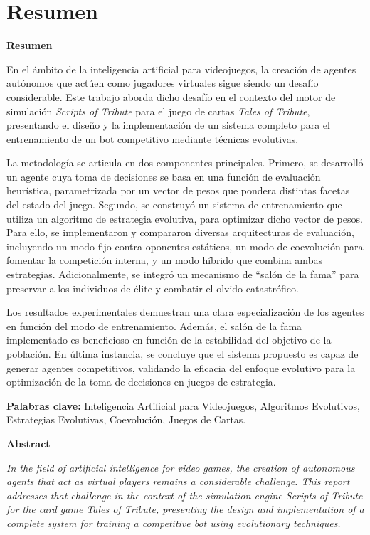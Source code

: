 \chapter*{Resumen}

{\large\textbf{Resumen}}

En el ámbito de la inteligencia artificial para videojuegos, la creación de agentes autónomos que actúen como jugadores virtuales sigue siendo un desafío considerable. Este trabajo aborda dicho desafío en el contexto del motor de simulación \textit{Scripts of Tribute} para el juego de cartas \textit{Tales of Tribute}, presentando el diseño y la implementación de un sistema completo para el entrenamiento de un bot competitivo mediante técnicas evolutivas.

La metodología se articula en dos componentes principales. Primero, se desarrolló un agente cuya toma de decisiones se basa en una función de evaluación heurística, parametrizada por un vector de pesos que pondera distintas facetas del estado del juego. Segundo, se construyó un sistema de entrenamiento que utiliza un algoritmo de estrategia evolutiva, para optimizar dicho vector de pesos. Para ello, se implementaron y compararon diversas arquitecturas de evaluación, incluyendo un modo fijo contra oponentes estáticos, un modo de coevolución para fomentar la competición interna, y un modo híbrido que combina ambas estrategias. Adicionalmente, se integró un mecanismo de ``salón de la fama'' para preservar a los individuos de élite y combatir el olvido catastrófico.

Los resultados experimentales demuestran una clara especialización de los agentes en función del modo de entrenamiento. Además, el salón de la fama implementado es beneficioso en función de la estabilidad del objetivo de la población. En última instancia, se concluye que el sistema propuesto es capaz de generar agentes competitivos, validando la eficacia del enfoque evolutivo para la optimización de la toma de decisiones en juegos de estrategia.

\vspace{\baselineskip}
\noindent\textbf{Palabras clave:} Inteligencia Artificial para Videojuegos, Algoritmos Evolutivos, Estrategias Evolutivas, Coevolución, Juegos de Cartas.

\newpage
{\large\textbf{Abstract}}

\vspace{0.5\baselineskip}

\textit{In the field of artificial intelligence for video games, the creation of autonomous agents that act as virtual players remains a considerable challenge. This report addresses that challenge in the context of the simulation engine \textit{Scripts of Tribute} for the card game \textit{Tales of Tribute}, presenting the design and implementation of a complete system for training a competitive bot using evolutionary techniques.}

